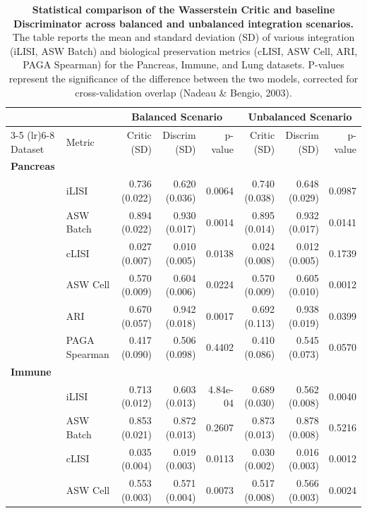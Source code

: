 \documentclass[unnumsec,webpdf,contemporary,large]{oup-authoring-template}%
\theoremstyle{thmstyleone}%
\theoremstyle{thmstyletwo}%
\theoremstyle{thmstylethree}%
\begin{document}
\begin{table}[t!]
\centering
\caption{\textbf{Statistical comparison of the Wasserstein Critic and baseline Discriminator across balanced and unbalanced integration scenarios.} The table reports the mean and standard deviation (SD) of various integration (iLISI, ASW Batch) and biological preservation metrics (cLISI, ASW Cell, ARI, PAGA Spearman) for the Pancreas, Immune, and Lung datasets. P-values represent the significance of the difference between the two models, corrected for cross-validation overlap (Nadeau \& Bengio, 2003).}
\label{tab:ttest_results_compact}
\setlength{\tabcolsep}{4pt}
\begin{tabular*}{\textwidth}{@{\extracolsep{\fill}} l l r r r r r r }
\toprule
 & & \multicolumn{3}{c}{\textbf{Balanced Scenario}} & \multicolumn{3}{c}{\textbf{Unbalanced Scenario}} \\
\cmidrule(lr){3-5} \cmidrule(lr){6-8}
Dataset & Metric & Critic (SD) & Discrim (SD) & p-value & Critic (SD) & Discrim (SD) & p-value \\
\midrule
\textbf{Pancreas} & & & & & & & \\
 & iLISI & 0.736 (0.022) & 0.620 (0.036) & 0.0064 & 0.740 (0.038) & 0.648 (0.029) & 0.0987 \\
 & ASW Batch & 0.894 (0.022) & 0.930 (0.017) & 0.0014 & 0.895 (0.014) & 0.932 (0.017) & 0.0141 \\
 & cLISI & 0.027 (0.007) & 0.010 (0.005) & 0.0138 & 0.024 (0.008) & 0.012 (0.005) & 0.1739 \\
 & ASW Cell & 0.570 (0.009) & 0.604 (0.006) & 0.0224 & 0.570 (0.009) & 0.605 (0.010) & 0.0012 \\
 & ARI & 0.670 (0.057) & 0.942 (0.018) & 0.0017 & 0.692 (0.113) & 0.938 (0.019) & 0.0399 \\
 & PAGA Spearman & 0.417 (0.090) & 0.506 (0.098) & 0.4402 & 0.410 (0.086) & 0.545 (0.073) & 0.0570 \\
\addlinespace
\textbf{Immune} & & & & & & & \\
 & iLISI & 0.713 (0.012) & 0.603 (0.013) & 4.84e-04 & 0.689 (0.030) & 0.562 (0.008) & 0.0040 \\
 & ASW Batch & 0.853 (0.021) & 0.872 (0.013) & 0.2607 & 0.873 (0.013) & 0.878 (0.008) & 0.5216 \\
 & cLISI & 0.035 (0.004) & 0.019 (0.003) & 0.0113 & 0.030 (0.002) & 0.016 (0.003) & 0.0012 \\
 & ASW Cell & 0.553 (0.003) & 0.571 (0.004) & 0.0073 & 0.517 (0.008) & 0.566 (0.003) & 0.0024 \\

\end{tabular*}
\end{table}
\end{document}
